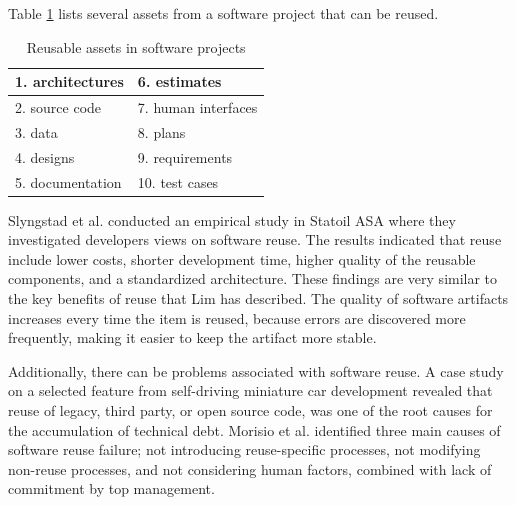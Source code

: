 Table \ref{tab:reusableComponents} lists several assets from a software project that can be reused\cite{frakes1996software}.
\begin{table}[H]
	\centering
	\begin{tabular}{ | l | l |}
	\hline
	1. architectures & 6. estimates \\ \hline
	2. source code & 7. human interfaces \\ \hline
	3. data & 8. plans \\ \hline
	4. designs & 9. requirements \\ \hline
	5. documentation & 10. test cases \\
	\hline
	\end{tabular}
	\caption{Reusable assets in software projects} \label{tab:reusableComponents}
\end{table}

Slyngstad et al.\cite{Slyngstad:2006:ESD:1159733.1159770} conducted an empirical study in Statoil ASA where they investigated developers views on software reuse. The results indicated that reuse include lower costs, shorter development time, higher quality of the reusable components, and a standardized architecture. These findings are very similar to the key benefits of reuse that Lim has described\cite{lim1994effects}. The quality of software artifacts increases every time the item is reused, because errors are discovered more frequently, making it easier to keep the artifact more stable\cite{sametinger1997software}.

Additionally, there can be problems associated with software reuse. A case study on a selected feature from self-driving miniature car development revealed that reuse of legacy, third party, or open source code, was one of the root causes for the accumulation of technical debt\cite{6974884}. Morisio et al.\cite{995420} identified three main causes of software reuse failure; not introducing reuse-specific processes, not modifying non-reuse processes, and not considering human factors, combined with lack of commitment by top management.



